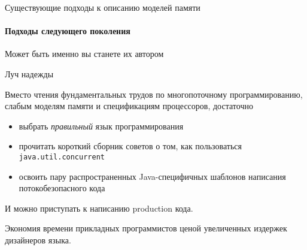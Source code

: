 \begin{frame}{Существующие подходы к описанию моделей памяти}
\framesubtitle{Подходы следующего поколения}

\pause
 
 Может быть именно вы станете их автором

\end{frame}




% 
% 
% 
% 
% 
% 


\begin{frame}{Луч надежды}

Вместо чтения фундаментальных трудов по многопоточному программированию, слабым моделям памяти и спецификациям процессоров, достаточно
\begin{itemize}
	\item выбрать \textit{правильный} язык программирования
	\item прочитать короткий сборник советов о том, как пользоваться \texttt{java.util.concurrent}
	\item освоить пару распространенных Java-специфичных шаблонов написания потокобезопасного кода 
\end{itemize}

\pause
И можно приступать к написанию production кода.

\pause
Экономия времени прикладных программистов ценой увеличенных издержек дизайнеров языка.

\end{frame}


